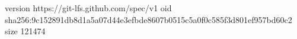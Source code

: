 version https://git-lfs.github.com/spec/v1
oid sha256:9c152891db8d1a5a07d44e3efbde8607b0515c5a0f0c585f3d801ef957bd60c2
size 121474
